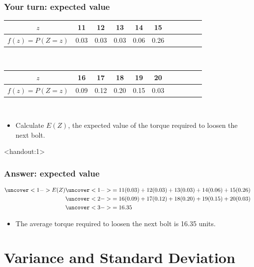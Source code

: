 \documentclass[handout]{beamer}\usepackage{graphicx, color}
\newcommand{\answers}{1}
\providecommand{\q}{$\quad$ \newline}
\numberwithin{equation}{section}
\begin{document}
\begin{frame}
\frametitle{Your turn: expected value}

\begin{center}
\begin{tabular}{ccccccccccc}
$z$ & 11 & 12 & 13 & 14 & 15 \\ \hline
$f(z) = P(Z = z)$ & 0.03 & 0.03 & 0.03 & 0.06 & 0.26 
\end{tabular} \q

\begin{tabular}{ccccccccccc}
$z$ & 16 & 17 & 18 & 19 & 20 \\ \hline
$f(z) = P(Z = z)$ &  0.09 & 0.12 & 0.20 & 0.15 & 0.03 
\end{tabular} \q 
\end{center}

\begin{itemize}
\item Calculate $E(Z)$, the expected value of the torque required to loosen the next bolt.
\end{itemize}
\end{frame}

\begin{frame}<handout:\answers>
\frametitle{Answer: expected value}\scriptsize
\begin{align*}
\uncover<1->{E(Z)} & \uncover<1->{= 11 (0.03) + 12(0.03) + 13(0.03) + 14(0.06) + 15(0.26)} \\
& \uncover<2->{= 16(0.09) + 17(0.12) + 18(0.20) + 19(0.15) + 20(0.03)} \\
& \uncover<3->{= 16.35}
\end{align*}

\begin{itemize}
\pause \pause \pause \item The average torque required to loosen the next bolt is 16.35 units.
\end{itemize}
\end{frame}






\section{Variance and Standard Deviation}
\end{document}

